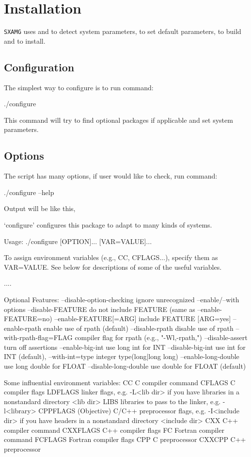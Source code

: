 
\chapter{Installation}


\verb|SXAMG| uses {} and {} 
to detect system parameters, to set default parameters, to build and to install.

\section{Configuration}
The simplest way to configure is to run command:
\begin{evb}
./configure
\end{evb}

This command will try to find optional packages if applicable and set system parameters.

\section{Options}
The script {\color{blue}{configure}} has many options, if user would like to check, 
run command:
\begin{evb}
./configure --help
\end{evb}

Output will be like this,
\begin{evb}
`configure' configures this package to adapt to many kinds of systems.

Usage: ./configure [OPTION]... [VAR=VALUE]...

To assign environment variables (e.g., CC, CFLAGS...), specify them as
VAR=VALUE.  See below for descriptions of some of the useful variables.

....

Optional Features:
  --disable-option-checking  ignore unrecognized --enable/--with options
  --disable-FEATURE       do not include FEATURE (same as --enable-FEATURE=no)
  --enable-FEATURE[=ARG]  include FEATURE [ARG=yes]
  --enable-rpath          enable use of rpath (default)
  --disable-rpath         disable use of rpath
  --with-rpath-flag=FLAG  compiler flag for rpath (e.g., "-Wl,-rpath,")
  --disable-assert        turn off assertions
  --enable-big-int        use long int for INT
  --disable-big-int       use int for INT (default),
  --with-int=type         integer type(long|long long)
  --enable-long-double    use long double for FLOAT
  --disable-long-double   use double for FLOAT (default)

Some influential environment variables:
  CC          C compiler command
  CFLAGS      C compiler flags
  LDFLAGS     linker flags, e.g. -L<lib dir> if you have libraries in a
              nonstandard directory <lib dir>
  LIBS        libraries to pass to the linker, e.g. -l<library>
  CPPFLAGS    (Objective) C/C++ preprocessor flags, e.g. -I<include dir> if
              you have headers in a nonstandard directory <include dir>
  CXX         C++ compiler command
  CXXFLAGS    C++ compiler flags
  FC          Fortran compiler command
  FCFLAGS     Fortran compiler flags
  CPP         C preprocessor
  CXXCPP      C++ preprocessor
\end{evb}

